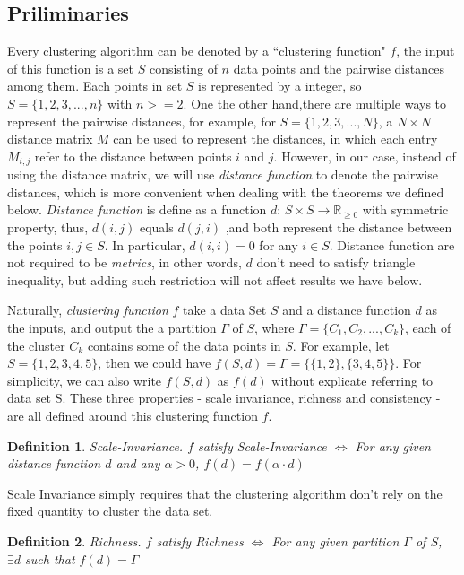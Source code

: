 \documentclass{uonmathreport}
\newtheorem{definition}{Definition}[section]
\begin{document}
\subsection{Priliminaries} \label{subsec:priliminaries}
Every clustering algorithm can be denoted by a ``clustering function" $f$, the input of this function is a set $S$ consisting of $n$ data points and the pairwise distances among them. Each points in set $S$ is represented by a integer, so $S = \{1,2,3,...,n\}$ with $n>=2 $. One the other hand,there are multiple ways to represent the pairwise distances, for example, for $S = \{1,2,3,...,N\}$, a $N \times N$ distance matrix $M$ can be used to represent the distances, in which each entry $M_{i,j}$ refer to the distance between points $i$ and $j$. However, in our case, instead of using the distance matrix, we will use \textit{distance function} to denote the pairwise distances, which is more convenient when dealing with the theorems we defined below. \textit{Distance function} is define as a function $d$: $S \times S \rightarrow \mathbb{R}_{\ge 0}$ with symmetric property, thus, $d(i,j)$ equals $d(j,i)$ ,and both represent the distance between the points $i,j \in S$. In particular, $d(i,i) = 0$ for any $i\in S$. Distance function are not required to be \textit{metrics}, in other words, $d$ don't need to satisfy triangle inequality, but adding such restriction will not affect results we have below.

Naturally, \textit{clustering function} $f$ take a data Set $S$ and a distance function $d$ as the inputs, and output the a partition $\Gamma$ of $S$, where $\Gamma = \{C_1,C_2,...,C_k\}$, each of the cluster $C_k$ contains some of the data points in $S$. For example, let $S = \{1,2,3,4,5\}$, then we could have $f(S,d)= \Gamma = \{ \{1,2\},\{3,4,5\} \}$. For simplicity, we can also write $f(S,d)$ as $f(d)$ without explicate referring to data set S. These three properties - scale invariance, richness and consistency - are all defined around this clustering function $f$.

\begin{definition}
Scale-Invariance. $f$ satisfy Scale-Invariance $\iff$  For any given distance function $d$ and any $\alpha>0$, $f(d) = f(\alpha\cdot d)$
\end{definition}

Scale Invariance simply requires that the clustering algorithm don't rely on the fixed quantity to cluster the data set.

\begin{definition}
Richness.  $f$ satisfy Richness $\iff$ For any given partition $\Gamma$ of $S$, $\exists d$ such that $f(d) =\Gamma$
\end{definition}
\end{document}
